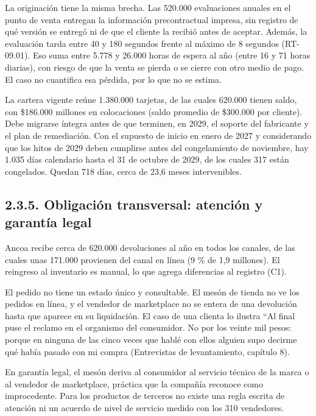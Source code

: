 \documentclass[11pt]{article}
\begin{document}
La originación tiene la misma brecha. Las 520.000 evaluaciones anuales en el punto de venta entregan la información precontractual impresa, sin registro de qué versión se entregó ni de que el cliente la recibió antes de aceptar. Además, la evaluación tarda entre 40 y 180 segundos frente al máximo de 8 segundos (RT-09.01). Eso suma entre 5.778 y 26.000 horas de espera al año (entre 16 y 71 horas diarias), con riesgo de que la venta se pierda o se cierre con otro medio de pago. El caso no cuantifica esa pérdida, por lo que no se estima.

La cartera vigente reúne 1.380.000 tarjetas, de las cuales 620.000 tienen saldo, con \$186.000 millones en colocaciones (saldo promedio de \$300.000 por cliente). Debe migrarse íntegra antes de que terminen, en 2029, el soporte del fabricante y el plan de remediación. Con el supuesto de inicio en enero de 2027 y considerando que los hitos de 2029 deben cumplirse antes del congelamiento de noviembre, hay 1.035 días calendario hasta el 31 de octubre de 2029, de los cuales 317 están congelados. Quedan 718 días, cerca de 23,6 meses intervenibles.

\subsection{2.3.5. Obligación transversal: atención y garantía legal}\label{obligaciuxf3n-transversal-atenciuxf3n-y-garantuxeda-legal}

Ancoa recibe cerca de 620.000 devoluciones al año en todos los canales, de las cuales unas 171.000 provienen del canal en línea (9 \% de 1,9 millones). El reingreso al inventario es manual, lo que agrega diferencias al registro (C1).

El pedido no tiene un estado único y consultable. El mesón de tienda no ve los pedidos en línea, y el vendedor de marketplace no se entera de una devolución hasta que aparece en su liquidación. El caso de una clienta lo ilustra ``Al final puse el reclamo en el organismo del consumidor. No por los veinte mil pesos: porque en ninguna de las cinco veces que hablé con ellos alguien supo decirme qué había pasado con mi compra (Entrevistas de levantamiento, capítulo 8).

En garantía legal, el mesón deriva al consumidor al servicio técnico de la marca o al vendedor de marketplace, práctica que la compañía reconoce como improcedente. Para los productos de terceros no existe una regla escrita de atención ni un acuerdo de nivel de servicio medido con los 310 vendedores.
\end{document}
